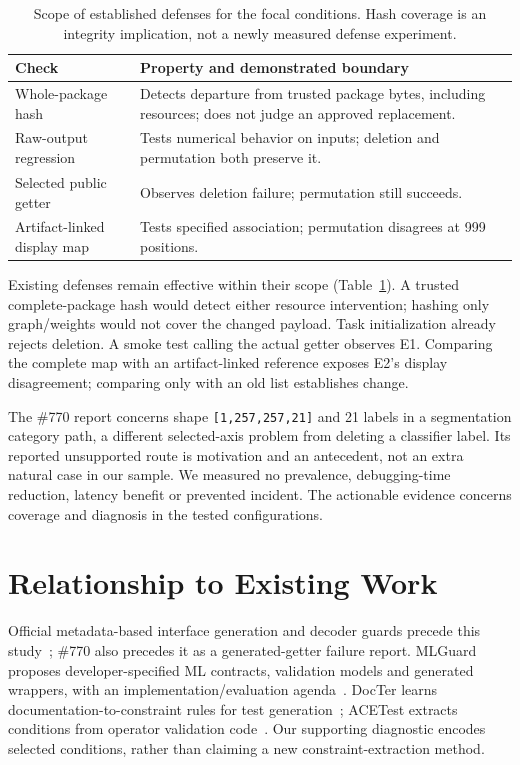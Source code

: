 \documentclass[10pt,conference]{IEEEtran}
\newcommand{\code}[1]{\texttt{#1}}
\begin{document}
\begin{table}[t]
\caption{Scope of established defenses for the focal conditions. Hash coverage is an integrity implication, not a newly measured defense experiment.}
\label{tab:coverage}
\centering\footnotesize
\begin{tabularx}{\columnwidth}{@{}p{}X@{}}
\toprule
Check & Property and demonstrated boundary\\
\midrule
Whole-package hash & Detects departure from trusted package bytes, including resources; does not judge an approved replacement.\\
Raw-output regression & Tests numerical behavior on inputs; deletion and permutation both preserve it.\\
Selected public getter & Observes deletion failure; permutation still succeeds.\\
Artifact-linked display map & Tests specified association; permutation disagrees at 999 positions.\\
\bottomrule
\end{tabularx}
\end{table}

Existing defenses remain effective within their scope (Table~\ref{tab:coverage}). A trusted complete-package hash would detect either resource intervention; hashing only graph/weights would not cover the changed payload. Task initialization already rejects deletion. A smoke test calling the actual getter observes E1. Comparing the complete map with an artifact-linked reference exposes E2's display disagreement; comparing only with an old list establishes change.

The \#770 report concerns shape \code{[1,257,257,21]} and 21 labels in a segmentation category path, a different selected-axis problem from deleting a classifier label. Its reported unsupported route is motivation and an antecedent, not an extra natural case in our sample. We measured no prevalence, debugging-time reduction, latency benefit or prevented incident. The actionable evidence concerns coverage and diagnosis in the tested configurations.

\section{Relationship to Existing Work}
\label{sec:related}
Official metadata-based interface generation and decoder guards precede this study~\cite{codegen-doc,tensorlabel}; \#770 also precedes it as a generated-getter failure report. MLGuard proposes developer-specified ML contracts, validation models and generated wrappers, with an implementation/evaluation agenda~\cite{mlguard}. DocTer learns documentation-to-constraint rules for test generation~\cite{docter}; ACETest extracts conditions from operator validation code~\cite{acetest}. Our supporting diagnostic encodes selected conditions, rather than claiming a new constraint-extraction method.
\end{document}
